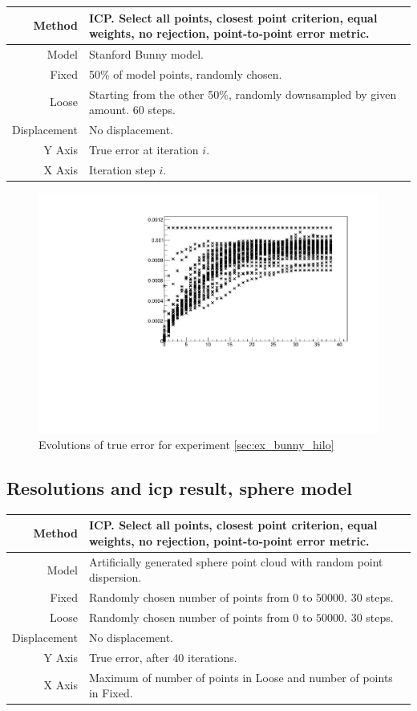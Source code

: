 {\begin{tabularx}{\textwidth}{|r|X|} \hline
Method & ICP. Select all points, closest point criterion, equal weights, no rejection, point-to-point error metric. \\ \hline
Model & Stanford Bunny model. \\ \hline
Fixed & 50\% of model points, randomly chosen. \\ \hline
Loose & Starting from the other 50\%, randomly downsampled by given amount. $60$ steps. \\ \hline
Displacement & No displacement. \\ \hline
Y Axis & True error at iteration $i$. \\\hline
X Axis & Iteration step $i$. \\ \hline
\end{tabularx}

\begin{figure}[H]
\centering
\includegraphics[width=.7\textwidth]{fig/bunny_globmin_ev.pdf}
\caption{Evolutions of true error for experiment \ref{sec:ex_bunny_hilo}}
\label{fig:bunny_hilo_ev}
\end{figure}


\subsection{Resolutions and \gls{icp} result, sphere model} \label{sec:ex_sphere_hilo}
\begin{tabularx}{\textwidth}{|r|X|} \hline
Method & ICP. Select all points, closest point criterion, equal weights, no rejection, point-to-point error metric. \\ \hline
Model & Artificially generated sphere point cloud with random point dispersion. \\ \hline
Fixed & Randomly chosen number of points from $0$ to $50000$. $30$ steps. \\ \hline
Loose & Randomly chosen number of points from $0$ to $50000$. $30$ steps. \\ \hline
Displacement & No displacement. \\ \hline
Y Axis & True error, after $40$ iterations. \\\hline
X Axis & Maximum of number of points in Loose and number of points in Fixed. \\ \hline
\end{tabularx}

}
